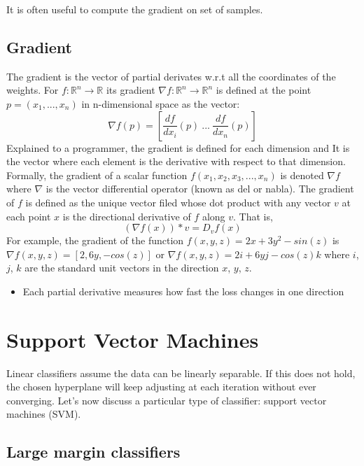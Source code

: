 \documentclass{article}
\begin{document}
It is often useful to compute the gradient on set of samples.

\subsection{Gradient}\label{gradient}

The gradient is the vector of partial derivates w.r.t all the
coordinates of the weights. For
\(f: \mathbb{R}^n \rightarrow \mathbb{R}\) its gradient
\(\nabla f:\mathbb{R}^n \rightarrow \mathbb{R}^n\) is defined at the
point \(p=(x_1, ..., x_n)\) in n-dimensional space as the vector:
\[\nabla f(p) = [\frac{df}{dx_i}(p)\ ...\ \frac{df}{dx_n}(p) ]\]
Explained to a programmer, the gradient is defined for each dimension
and It is the vector where each element is the derivative with respect
to that dimension. Formally, the gradient of a scalar function
\(f(x_1, x_2, x_3, ..., x_n)\) is denoted \(\nabla f\) where \(\nabla\)
is the vector differential operator (known as del or nabla). The
gradient of \(f\) is defined as the unique vector filed whose dot
product with any vector \(v\) at each point \(x\) is the directional
derivative of \(f\) along \(v\). That is, \[(\nabla f(x))*v = D_vf(x)\]
For example, the gradient of the function
\(f(x, y, z)=2x + 3y^2 - sin(z)\) is
\(\nabla f(x, y, z)=[2, 6y, -cos(z)]\) or
\(\nabla f(x, y, z)=2i+6yj-cos(z)k\) where \(i\), \(j\), \(k\) are the
standard unit vectors in the direction \(x\), \(y\), \(z\).

\begin{itemize}
\tightlist
\item
  Each partial derivative measures how fast the loss changes in one
  direction
\end{itemize}

\section{Support Vector Machines}\label{support-vector-machines}

Linear classifiers assume the data can be linearly separable. If this
does not hold, the chosen hyperplane will keep adjusting at each
iteration without ever converging. Let's now discuss a particular type
of classifier: support vector machines (SVM).

\subsection{Large margin classifiers}\label{large-margin-classifiers}
\end{document}
